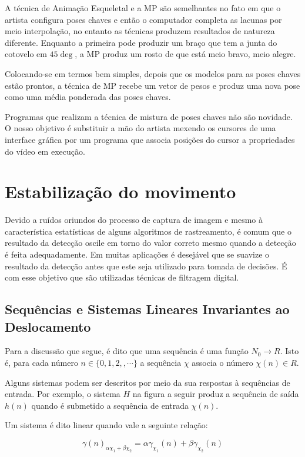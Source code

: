 {A técnica de Animação Esqueletal e a MP são semelhantes no fato em que o artista configura poses chaves e então o computador completa as lacunas por meio interpolação, no entanto as técnicas produzem resultados de natureza diferente. Enquanto a primeira pode produzir um braço que tem a junta do cotovelo em $45\deg$, a MP produz um rosto de que está meio bravo, meio alegre.

Colocando-se em termos bem simples, depois que os modelos para as poses chaves estão prontos, a técnica de MP recebe um vetor de pesos e produz uma nova pose como uma média ponderada das poses chaves.

	Programas que realizam a técnica de mistura de poses chaves não são novidade. O nosso objetivo é substituir a mão do artista mexendo os cursores de uma interface gráfica por um programa que associa posições do cursor a propriedades do vídeo em execução.


\section{Estabilização do movimento}

Devido a ruídos oriundos do processo de captura de imagem e mesmo à
característica estatísticas de alguns algoritmos de rastreamento, é comum que o
resultado da detecção oscile em torno do valor correto mesmo quando a detecção é
feita adequadamente. Em muitas aplicações é desejável que se suavize o resultado
da detecção antes que este seja utilizado para tomada de decisões. É com esse
objetivo que são utilizadas técnicas de filtragem digital. 

\subsection{Sequências e Sistemas Lineares Invariantes ao Deslocamento}
 
Para a discussão que segue, é dito que uma sequência é uma função 
$N_0 \rightarrow R$. Isto é, para cada número $n\in \{0,1,2,,\cdots\}$ a
sequência $\chi$ associa o número $\chi(n) \in R$.

Alguns sistemas podem ser descritos por meio da sua respostas à sequências de
entrada. Por exemplo, o sistema $H$ na figura a seguir produz a sequência de saída
$h(n)$ quando é submetido a sequência de entrada $\chi(n)$.

Um sistema é dito linear quando vale a seguinte relação:

\begin{equation}
\gamma(n)_{\alpha \chi_1 + \beta \chi_2} = \alpha \gamma_{\chi_1}(n) + \beta \gamma_{\chi_2}(n)
\end{equation}

}
